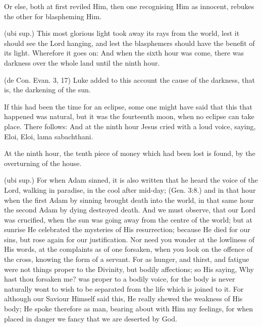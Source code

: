  Or else, both at first reviled Him, then one recognising Him as innocent, rebukes the other for blaspheming Him.

 

 (ubi sup.) This most glorious light took away its rays from the world, lest it should see the Lord hanging, and lest the blasphemers should have the benefit of its light. Wherefore it goes on: And when the sixth hour was come, there was darkness over the whole land until the ninth hour.

 (de Con. Evan. 3, 17) Luke added to this account the cause of the darkness, that is, the darkening of the sun.

 If this had been the time for an eclipse, some one might have said that this that happened was natural, but it was the fourteenth moon, when no eclipse can take place. There follows: And at the ninth hour Jesus cried with a loud voice, saying, Eloi, Eloi, lama sabachthani.

 At the ninth hour, the tenth piece of money which had been lost is found, by the overturning of the house.

 (ubi sup.) For when Adam sinned, it is also written that he heard the voice of the Lord, walking in paradise, in the cool after mid-day; (Gen. 3:8.) and in that hour when the first Adam by sinning brought death into the world, in that same hour the second Adam by dying destroyed death. And we must observe, that our Lord was crucified, when the sun was going away from the centre of the world; but at sunrise He celebrated the mysteries of His resurrection; because He died for our sins, but rose again for our justification. Nor need you wonder at the lowliness of His words, at the complaints as of one forsaken, when you look on the offence of the cross, knowing the form of a servant. For as hunger, and thirst, and fatigue were not things proper to the Divinity, but bodily affections; so His saying, Why hast thou forsaken me? was proper to a bodily voice, for the body is never naturally wont to wish to be separated from the life which is joined to it. For although our Saviour Himself said this, He really shewed the weakness of His body; He spoke therefore as man, bearing about with Him my feelings, for when placed in danger we fancy that we are deserted by God.


